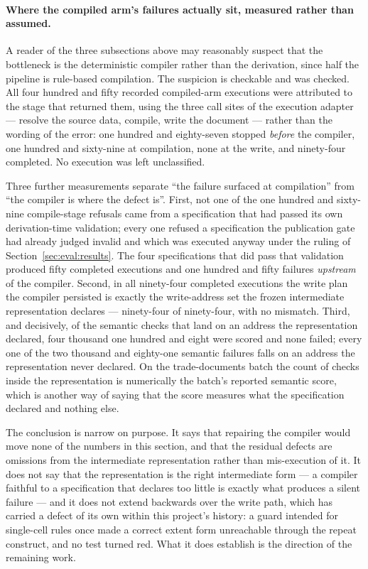 \paragraph{Where the compiled arm's failures actually sit, measured rather than assumed.}
A reader of the three subsections above may reasonably suspect that the bottleneck is the
deterministic compiler rather than the derivation, since half the pipeline is rule-based
compilation. The suspicion is checkable and was checked. All four hundred and fifty recorded
compiled-arm executions were attributed to the stage that returned them, using the three call
sites of the execution adapter --- resolve the source data, compile, write the document ---
rather than the wording of the error: one hundred and eighty-seven stopped \emph{before} the
compiler, one hundred and sixty-nine at compilation, none at the write, and ninety-four
completed. No execution was left unclassified.

Three further measurements separate ``the failure surfaced at compilation'' from ``the compiler
is where the defect is''. First, not one of the one hundred and sixty-nine compile-stage
refusals came from a specification that had passed its own derivation-time validation; every
one refused a specification the publication gate had already judged invalid and which was
executed anyway under the ruling of Section~\ref{sec:eval:results}. The four specifications that
did pass that validation produced fifty completed executions and one hundred and fifty failures
\emph{upstream} of the compiler. Second, in all ninety-four completed executions the write plan
the compiler persisted is exactly the write-address set the frozen intermediate representation
declares --- ninety-four of ninety-four, with no mismatch. Third, and decisively, of the semantic
checks that land on an address the representation declared, four thousand one hundred and eight
were scored and none failed; every one of the two thousand and eighty-one semantic failures
falls on an address the representation never declared. On the trade-documents batch the count of
checks inside the representation is numerically the batch's reported semantic score, which is
another way of saying that the score measures what the specification declared and nothing else.

The conclusion is narrow on purpose. It says that repairing the compiler would move none of the
numbers in this section, and that the residual defects are omissions from the intermediate
representation rather than mis-execution of it. It does not say that the representation is the
right intermediate form --- a compiler faithful to a specification that declares too little is
exactly what produces a silent failure --- and it does not extend backwards over the write path,
which has carried a defect of its own within this project's history: a guard intended for
single-cell rules once made a correct extent form unreachable through the repeat construct, and
no test turned red. What it does establish is the direction of the remaining work.

